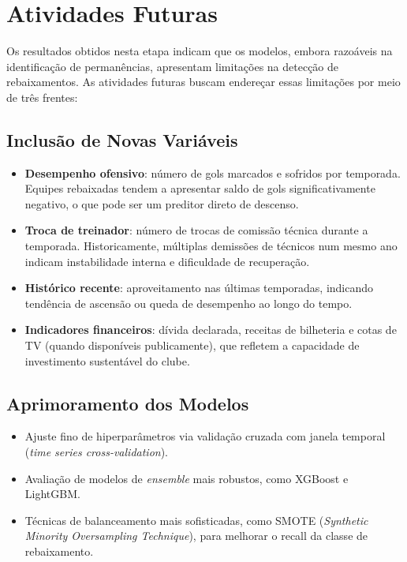 \section{Atividades Futuras}

Os resultados obtidos nesta etapa indicam que os modelos, embora razoáveis
na identificação de permanências, apresentam limitações na detecção de rebaixamentos.
As atividades futuras buscam endereçar essas limitações por meio de três frentes:

\subsection{Inclusão de Novas Variáveis}

\begin{itemize}
    \item \textbf{Desempenho ofensivo}: número de gols marcados e sofridos por temporada.
          Equipes rebaixadas tendem a apresentar saldo de gols significativamente negativo,
          o que pode ser um preditor direto de descenso.

    \item \textbf{Troca de treinador}: número de trocas de comissão técnica durante
          a temporada. Historicamente, múltiplas demissões de técnicos num mesmo
          ano indicam instabilidade interna e dificuldade de recuperação.

    \item \textbf{Histórico recente}: aproveitamento nas últimas temporadas,
          indicando tendência de ascensão ou queda de desempenho ao longo do tempo.

    \item \textbf{Indicadores financeiros}: dívida declarada, receitas de bilheteria
          e cotas de TV (quando disponíveis publicamente), que refletem a capacidade
          de investimento sustentável do clube.
\end{itemize}

\subsection{Aprimoramento dos Modelos}

\begin{itemize}
    \item Ajuste fino de hiperparâmetros via validação cruzada com janela temporal
          (\textit{time series cross-validation}).
    \item Avaliação de modelos de \textit{ensemble} mais robustos, como XGBoost e LightGBM.
    \item Técnicas de balanceamento mais sofisticadas, como SMOTE
          (\textit{Synthetic Minority Oversampling Technique}), para melhorar
          o recall da classe de rebaixamento.
\end{itemize}

